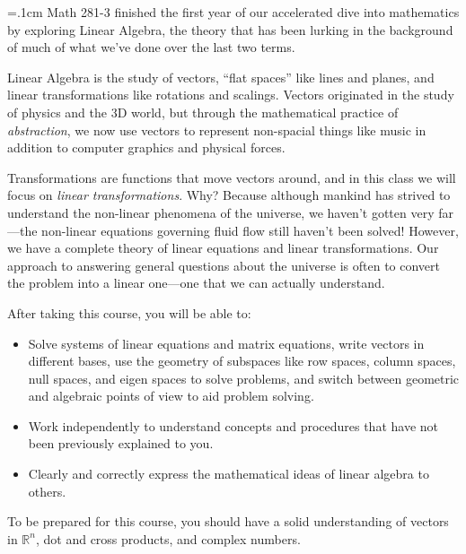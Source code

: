 \documentclass[12pt]{article}
\def\mydot{\textcolor{deeppurple}{\rule{1ex}{1ex}}}
\newlength\sidebarwidth
\newcommand{\topic}[3][]%
	 {\pagebreak[2]%
	 \vspace{.2cm}
	 \begin{minipage}{\textwidth}
         \phantomsection\addcontentsline{toc}{section}{#1}%
         \nopagebreak\hspace{0in}%
         \nopagebreak\begin{minipage}[t]{\sidebarwidth - .2cm}
         \raggedleft \bf\sc 
	 \color{deeppurple}{\large #2}
	 \end{minipage}%
	 \hfill
	 \begin{minipage}[t]{\linewidth - \sidebarwidth}
	 \nopagebreak{\color{deeppurple}%
		    \rule{0pt}{\baselineskip}%
		    \rule{\linewidth}{2.5pt}%
		    \llap{\raisebox{.3\baselineskip}{\sf #1}}%
		    \vspace*{.1\baselineskip}%
		    }%
	 #3%
	 \end{minipage}
	 \end{minipage}}
\begin{document}
	\small
	\hspace{\sidebarwidth}\begin{minipage}[t]{\textwidth - \sidebarwidth}
	{
		\parskip=.1cm
	Math 281-3 finished the first year of our accelerated dive into mathematics by exploring
	Linear Algebra, the theory that has been lurking in the background of much
	of what we've done over the last two terms.
	
	Linear Algebra is the study of vectors,
	``flat spaces'' like lines and planes, and linear transformations like 
	rotations and scalings.  Vectors originated in the study of physics and
	the 3D world, but through the mathematical practice of \emph{abstraction},
	we now use vectors to represent non-spacial things like music in addition
	to computer graphics and physical forces.
	
	Transformations are functions that move vectors around, and in this class
	we will focus on \emph{linear transformations}.  Why?  Because although
	mankind has strived to understand the non-linear phenomena of the universe,
	we haven't gotten very far---the non-linear equations governing fluid flow
	still haven't been solved!  However, we have a complete theory of linear
	equations and linear transformations.  Our approach to answering general questions
	about the universe is often to convert the problem into a linear one---one that we
	can actually understand.
	}
	\end{minipage}
	
	\topic{Learning Outcomes}{
		After taking this course, you will be able to:

		\vspace{-.4cm}
		\begin{itemize}[leftmargin=1cm, itemsep=0ex, parsep=.5ex, labelindent=-4ex, label={\mydot}]
			\item Solve systems of linear equations and matrix equations, write vectors
				in different bases, use the geometry of subspaces
				like row spaces, column spaces, null spaces, and eigen spaces to solve
				problems, and switch between geometric and algebraic points
				of view to aid problem solving.
			\item Work independently to understand concepts and procedures that have
				not been previously explained to you.
			\item Clearly and correctly express the mathematical ideas of linear algebra
				to others.
		\end{itemize}
	}


	\topic{Prerequisites}{
		To be prepared for this course, you should have 
		a solid understanding of vectors in $\mathbb {R}^n$, dot and cross products, and complex
		numbers.
	}
	
\end{document}
